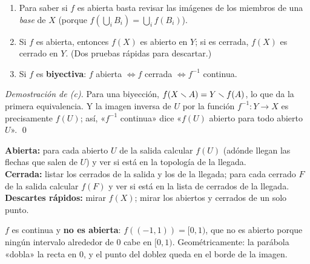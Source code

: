 \begin{teorema}
\begin{enumerate}[label=(\alph*),leftmargin=1.9em]
\item Para saber si $f$ es abierta basta revisar las imágenes de los miembros de una \emph{base} de $X$ (porque
$f(\bigcup_iB_i)=\bigcup_if(B_i)$).
\item Si $f$ es abierta, entonces $f(X)$ es abierto en $Y$; si es cerrada, $f(X)$ es cerrado en $Y$. (Dos pruebas
rápidas para descartar.)
\item Si $f$ es \textbf{biyectiva}: $f$ abierta $\iff f$ cerrada $\iff f^{-1}$ continua.
\end{enumerate}
\end{teorema}
\emph{Demostración de (c).} Para una biyección, $f(X\smallsetminus A)=Y\smallsetminus f(A)$, lo que da la primera equivalencia. Y la imagen
inversa de $U$ por la función $f^{-1}:Y\to X$ es precisamente $f(U)$; así, «$f^{-1}$ continua» dice «$f(U)$ abierto para
todo abierto $U$». \qed

\begin{metodo}
\textbf{Abierta:} para cada abierto $U$ de la salida calcular $f(U)$ (adónde llegan las flechas que salen de $U$) y
ver si está en la topología de la llegada.\\[2pt]
\textbf{Cerrada:} listar los cerrados de la salida y los de la llegada; para cada cerrado $F$ de la salida calcular
$f(F)$ y ver si está en la lista de cerrados de la llegada.\\[2pt]
\textbf{Descartes rápidos:} mirar $f(X)$; mirar los abiertos y cerrados de un solo punto.
\end{metodo}

\begin{ejemplo}[Ejemplo: problema IV.2, $f(x)=x^2$ en $\R$]
$f$ es continua y \textbf{no es abierta}: $f((-1,1))=[0,1)$, que no es abierto porque ningún intervalo alrededor de $0$
cabe en $[0,1)$. Geométricamente: la parábola «dobla» la recta en $0$, y el punto del doblez queda en el
borde de la imagen.
\end{ejemplo}

